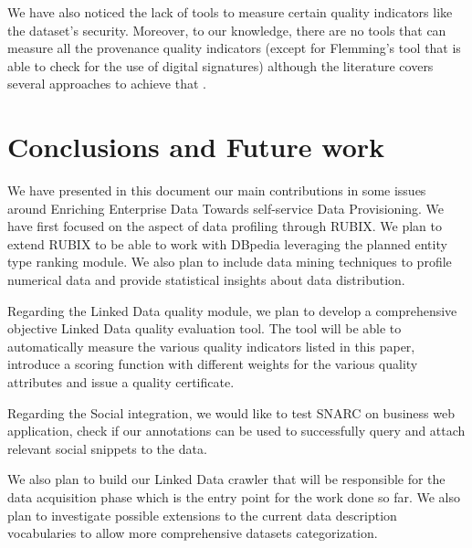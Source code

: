 \documentclass[onecolumn, crcready]{iosart2c}
\begin{document}
We have also noticed the lack of tools to measure certain quality indicators like the dataset's security. Moreover, to our knowledge, there are no tools that can measure all the provenance quality indicators (except for Flemming's tool that is able to check for the use of digital signatures) although the literature covers several approaches to achieve that \cite{Hartig09usingweb}\cite{Flouris2012}\cite{Harth2009}.


\section{Conclusions and Future work}

We have presented in this document our main contributions in some issues around Enriching Enterprise Data Towards self-service Data Provisioning. We have first focused on the aspect of data profiling through RUBIX. We plan to extend RUBIX to be able to work with DBpedia leveraging the planned entity type ranking module. We also plan to include data mining techniques to profile numerical data and provide statistical insights about data distribution. 

Regarding the Linked Data quality module, we plan to develop a comprehensive objective Linked Data quality evaluation tool. The tool will be able to automatically measure the various quality indicators listed in this paper, introduce a scoring function with different weights for the various quality attributes and issue a quality certificate.

Regarding the Social integration, we would like to test SNARC on business web application, check if our annotations can be used to successfully query and attach relevant social snippets to the data.

We also plan to build our Linked Data crawler that will be responsible for the data acquisition phase which is the entry point for the work done so far. We also plan to investigate possible extensions to the current data description vocabularies to allow more comprehensive datasets categorization. 


\nocite{*}


\end{document}
